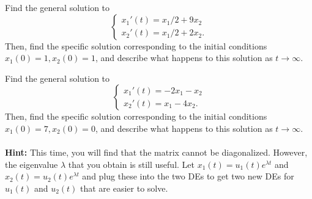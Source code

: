 \documentclass[12pt,letterpaper]{hmcpset}
\begin{document}
\begin{problem}[4]
    Find the general solution to
    \[
        \begin{cases}
            x_1'(t)=x_1/2+9x_2\\
            x_2'(t)=x_1/2+2x_2.
        \end{cases}
    \]
    Then, find the specific solution corresponding to the initial
    conditions $x_1(0)=1,x_2(0)=1$, and describe what happens to
    this solution as $t\to\infty$.
\end{problem}
\begin{solution}
    \vfill
\end{solution}
\newpage

\begin{problem}[5]
    Find the general solution to
    \[
        \begin{cases}
            x_1'(t)=-2x_1-x_2\\
            x_2'(t)=x_1-4x_2.
        \end{cases}
    \]
    Then, find the specific solution corresponding to the initial
    conditions $x_1(0)=7,x_2(0)=0$, and describe what happens to
    this solution as $t\to\infty$.\\\\
    \textbf{Hint:} This time, you will find that the matrix cannot be
    diagonalized. However, the eigenvalue $\lambda$ that you obtain is
    still useful. Let $x_1(t)=u_1(t)e^{\lambda t}$ and
    $x_2(t)=u_2(t)e^{\lambda t}$ and plug these into the two DEs to
    get two new DEs for $u_1(t)$ and $u_2(t)$ that are easier to
    solve.
\end{problem}
\begin{solution}
    \vfill
\end{solution}
\end{document}
